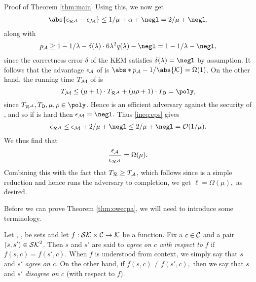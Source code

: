 \begin{namedproof}{Proof of Theorem \ref{thm:main}}
  Using this, we now get
  \begin{align}\label{ineq:eps}
    \abs{\epsilon_{\redR^{\advA}} - \epsilon_{\redM}} \le 1/\mu + \alpha + \negl
    = 2/\mu + \negl,
  \end{align}
  along with
  \begin{align}
    p_{\advA} \ge 1 - 1/\lambda - \delta(\lambda) \cdot 6 \lambda^{2} q(\lambda) - \negl
    = 1 - 1/\lambda - \negl,
  \end{align}
  since the correctness error \(\delta\) of the KEM \KEM satisfies \(\delta(\lambda) = \negl\) by assumption.
  It follows that the advantage \(\epsilon_{\mathcal{A}}\) of \advA is
  \(\abs*{p_{\advA} - 1/\abs{\keyspace}} = \Omega(1)\).
  On the other hand, the running time \(T_{\mathcal{M}}\) of \redM is
  \[
    T_{\redM} \le (\mu + 1) \cdot T_{\redR^{\advA}} + (\mu \rho + 1) \cdot T_{\Decaps}
    = \poly,
  \]
  since \(T_{\redR^{\advA}},T_{\Decaps},\mu,\rho \in \poly\).
  Hence \redM is an efficient adversary against the \SICA security of \Simple,
  and so if \Simple is hard then
  \(
    \epsilon_{\redM} = \negl.
  \)
  Thus \eqref{ineq:eps} gives
  \begin{align}
    \epsilon_{\redR^{\advA}} \le  \epsilon_{\redM} + 2/\mu + \negl \le 2/\mu + \negl
    = \mathcal{O}(1/\mu).
  \end{align}
  We thus find that
  \begin{align}
    \frac{\epsilon_{\advA}}{\epsilon_{\redR^{\advA}}} = \Omega(\mu).
  \end{align}
  Combining this with the fact that \(T_{\redR} \ge T_{\advA}\),
  which follows since \redR is a simple reduction and
  hence runs the adversary \advA to completion,
  we get
  \(
    \ell = \Omega(\mu),
  \)
  as desired.
\end{namedproof}

Before we can prove Theorem \ref{thm:owecpa},
we will need to introduce some terminology.

\begin{definition}\label{def:agree}
  Let \setSK, \setC, \keyspace be sets and
  let \(f : \mathcal{SK} \times \mathcal{C} \to \mathcal{K}\) be a function.
  Fix a \(c \in \mathcal{C}\) and a pair \((s,s') \in \mathcal{SK}^{2}\).
  Then \(s\) and \(s'\) are said to \emph{agree on \(c\) with respect to \(f\)} if
  \(
    f(s,c) = f(s',c).
  \)
  When \(f\) is understood from context, we simply say that \(s\) and \(s'\) \emph{agree on \(c\)}.
  On the other hand, if
  \(
    f(s,c) \ne f(s',c),
  \)
  then we say that \(s\) and \(s'\) \emph{disagree on \(c\)} (with respect to \(f\)).
\end{definition}

